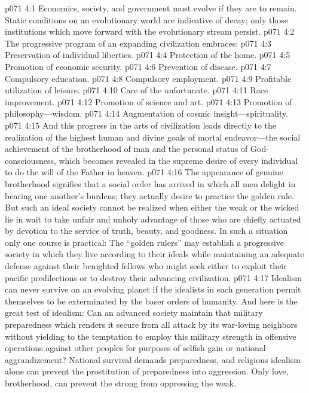 \vs p071 4:1 Economics, society, and government must evolve if they are to remain. Static conditions on an evolutionary world are indicative of decay; only those institutions which move forward with the evolutionary stream persist.
\pc \vs p071 4:2 The progressive program of an expanding civilization embraces:
\pc \vs p071 4:3 \bibnobreakspace Preservation of individual liberties.
\vs p071 4:4 \bibnobreakspace Protection of the home.
\vs p071 4:5 \bibnobreakspace Promotion of economic security.
\vs p071 4:6 \bibnobreakspace Prevention of disease.
\vs p071 4:7 \bibnobreakspace Compulsory education.
\vs p071 4:8 \bibnobreakspace Compulsory employment.
\vs p071 4:9 \bibnobreakspace Profitable utilization of leisure.
\vs p071 4:10 \bibnobreakspace Care of the unfortunate.
\vs p071 4:11 \bibnobreakspace Race improvement.
\vs p071 4:12 \bibnobreakspace Promotion of science and art.
\vs p071 4:13 \bibnobreakspace Promotion of philosophy---wisdom.
\vs p071 4:14 \bibnobreakspace Augmentation of cosmic insight---spirituality.
\pc \vs p071 4:15 And this progress in the arts of civilization leads directly to the realization of the highest human and divine goals of mortal endeavor---the social achievement of the brotherhood of man and the personal status of God\hyp{}consciousness, which becomes revealed in the supreme desire of every individual to do the will of the Father in heaven.
\vs p071 4:16 The appearance of genuine brotherhood signifies that a social order has arrived in which all men delight in bearing one another’s burdens; they actually desire to practice the golden rule. But such an ideal society cannot be realized when either the weak or the wicked lie in wait to take unfair and unholy advantage of those who are chiefly actuated by devotion to the service of truth, beauty, and goodness. In such a situation only one course is practical: The “golden rulers” may establish a progressive society in which they live according to their ideals while maintaining an adequate defense against their benighted fellows who might seek either to exploit their pacific predilections or to destroy their advancing civilization.
\vs p071 4:17 Idealism can never survive on an evolving planet if the idealists in each generation permit themselves to be exterminated by the baser orders of humanity. And here is the great test of idealism: Can an advanced society maintain that military preparedness which renders it secure from all attack by its war\hyp{}loving neighbors without yielding to the temptation to employ this military strength in offensive operations against other peoples for purposes of selfish gain or national aggrandizement? National survival demands preparedness, and religious idealism alone can prevent the prostitution of preparedness into aggression. Only love, brotherhood, can prevent the strong from oppressing the weak.
